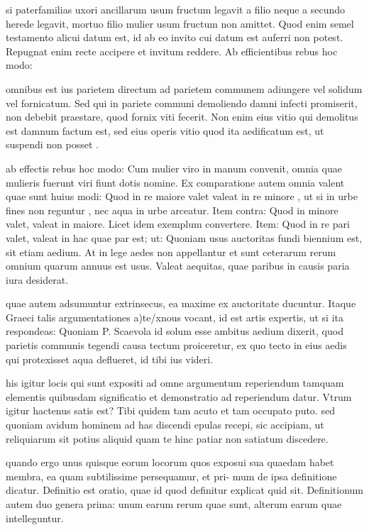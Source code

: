  si paterfamilias uxori ancillarum usum fructum legavit a filio neque a secundo herede legavit, mortuo filio mulier usum fructum non amittet. Quod enim semel testamento alicui datum est, id ab eo invito cui datum est auferri non potest. Repugnat enim recte accipere et invitum reddere. Ab efficientibus rebus hoc modo:

 omnibus est ius parietem directum ad parietem communem adiungere vel solidum vel fornicatum. Sed qui in pariete communi demoliendo damni infecti promiserit, non debebit praestare, quod fornix viti fecerit. Non enim eius vitio qui demolitus est damnum factum est, sed eius operis vitio quod ita aedificatum est, ut suspendi non posset .

 ab effectis rebus hoc modo: Cum mulier viro in manum convenit, omnia quae mulieris fuerunt viri fiunt dotis nomine. Ex comparatione autem omnia valent quae sunt huius modi: Quod in re maiore valet valeat in re minore , ut si in urbe fines non reguntur , nec aqua in urbe arceatur. Item contra: Quod in minore valet, valeat in maiore. Licet idem exemplum convertere. Item: Quod in re pari valet, valeat in hac quae par est; ut: Quoniam usus auctoritas fundi biennium est, sit etiam aedium. At in lege aedes non appellantur et sunt ceterarum rerum omnium quarum annuus est usus. Valeat aequitas, quae paribus in causis paria iura desiderat.

 quae autem adsumuntur extrinsecus, ea maxime ex auctoritate ducuntur. Itaque Graeci talis argumentationes a)te/xnous vocant, id est artis expertis, ut si ita respondeas: Quoniam P. Scaevola id solum esse ambitus aedium dixerit, quod parietis communis tegendi causa tectum proiceretur, ex quo tecto in eius aedis qui protexisset aqua deflueret, id tibi ius videri.

 his igitur locis qui sunt expositi ad omne argumentum reperiendum tamquam elementis quibusdam significatio et demonstratio ad reperiendum datur. Vtrum igitur hactenus satis est? Tibi quidem tam acuto et tam occupato puto. sed quoniam avidum hominem ad has discendi epulas recepi, sic accipiam, ut reliquiarum sit potius aliquid quam te hinc patiar non satiatum discedere.

 quando ergo unus quisque eorum locorum quos exposui sua quaedam habet membra, ea quam subtilissime persequamur, et pri- mum de ipsa definitione dicatur. Definitio est oratio, quae id quod definitur explicat quid sit. Definitionum autem duo genera prima: unum earum rerum quae sunt, alterum earum quae intelleguntur.

